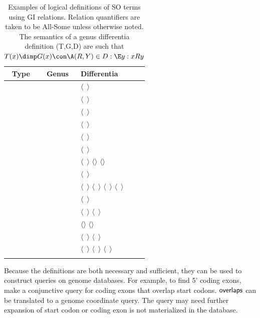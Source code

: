 \documentclass{article}
\newcommand{\rel}[1]{$\langle$#1$\rangle$}
\def\adjacentTo{\pr{adjacent\_to}}
\def\upstreamAdjacentTo{\pr{upstream\_adjacent\_to}}
\def\downstreamAdjacentTo{\pr{downstream\_adjacent\_to}}
\def\overlaps{\pr{overlaps}}
\def\containedBy{\pr{nt\_contained\_by}}
\def\disconnectedFrom{\pr{disconnected\_from}}
\def\starts{\pr{starts}}
\def\finishes{\pr{finishes}}
\def\intergenicRegion{\pr{intergenic\_region}}
\def\region{\pr{region}}
\def\intron{\pr{intron}}
\def\twintron{\pr{twintron}}
\def\codon{\pr{codon}}
\def\startCodon{\pr{start\_codon}}
\def\stopCodon{\pr{stop\_codon}}
\def\exon{\pr{exon}}
\def\interiorExon{\pr{interior\_exon}}
\def\interiorIntron{\pr{interior\_intron}}
\def\codingExon{\pr{coding\_exon}}
\def\CDS{\pr{CDS}}
\def\mRNA{\pr{mRNA}}
\def\mRNARegion{\pr{mRNA\_region}}
\def\transcript{\pr{transcript}}
\def\noncodingExon{\pr{noncoding\_exon}}
\def\fivePrimeCodingExon{\pr{five\_prime\_coding\_exon}}
\def\fivePrimeIntron{\pr{five\_prime\_intron}}
\def\fivePrimeUTR{\pr{five\_prime\_UTR}}
\def\fivePrimeSpliceSite{\pr{five\_prime\_splice\_site}}
\def\threePrimeSpliceSite{\pr{three\_prime\_splice\_site}}
\def\threePrimeUTR{\pr{three\_prime\_UTR}}
\def\interiorUTR{\pr{interior\_UTR}}
\def\UTR{\pr{UTR}}
\def\UTRIntron{\pr{UTR\_intron}}
\def\gene{\pr{gene}}
\def\spliceSite{\pr{splice\_site}}
\begin{document}
\begin{longtable}{ | c | c | p{5cm} | }
\hline
Type  & Genus & Differentia \\
\hline
\fivePrimeCodingExon  & \codingExon  & \rel{\overlaps\ \startCodon} \\
\hline
\fivePrimeIntron  & \intron  & \rel{\containedBy\ \fivePrimeUTR} \\
\hline
\UTRIntron  & \intron  & \rel{\overlaps\ \UTR} \\
\hline
\twintron  & \intron  & \rel{\containedBy\ \intron} \\
\hline
\startCodon  & \codon  & \rel{\starts\ \CDS} \\
\hline
\stopCodon  & \codon  & \rel{\finishes\ \CDS} \\
\hline
\intergenicRegion & \region & \rel{\disconnectedFrom\ \gene} \rel{\upstreamAdjacentTo \gene} \rel{\downstreamAdjacentTo \gene} \\
\hline
\noncodingExon & \exon & \rel{\disconnectedFrom\ \CDS} \\
\hline
\intron & \region & \rel{\containedBy\ \transcript} \rel{\upstreamAdjacentTo\ \exon} \rel{\downstreamAdjacentTo\ \exon} \rel{\disconnectedFrom\ \exon} \\
\hline
\interiorIntron & \intron & \rel{\containedBy\ \CDS} \\
\hline
\fivePrimeUTR  & \mRNARegion  & \rel{\upstreamAdjacentTo\ \CDS} \rel{\starts\ \mRNA} \\
\hline
\threePrimeUTR  & \mRNARegion  & \rel{\downstreamAdjacentTo \CDS} \rel{\finishes \mRNA} \\
\hline
\interiorUTR  & \mRNARegion  & \rel{\downstreamAdjacentTo\ \CDS} \rel{\upstreamAdjacentTo\ \CDS} \\
\hline
\interiorExon  & \exon  & \rel{\adjacentTo\ \fivePrimeSpliceSite} \rel{\adjacentTo\ \threePrimeSpliceSite} \rel{\disconnectedFrom\ \spliceSite} \\
\hline
\caption{Examples of logical definitions of SO terms using GI
  relations. Relation quantifiers are taken to be All-Some unless otherwise
  noted. The semantics of a genus differentia definition (T,G,D) are
  such that $T(x) \dimp G(x) \con \A (R,Y) \in D : \E y : xRy$}
\label{tab:definitions}
\end{longtable}


Because the definitions are both necessary and sufficient, they can be
used to construct queries on genome databases. For example, to find 5'
coding exons, make a conjunctive query for coding exons that overlap
start codons. $\overlaps $ can be translated to a genome coordinate
query. The query may need further expansion of start codon or coding
exon is not materialized in the database.
\end{document}
